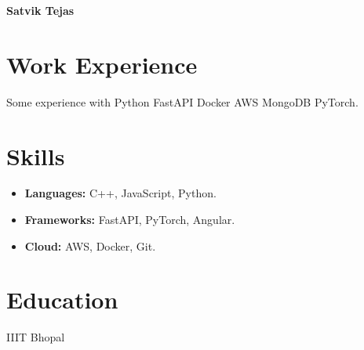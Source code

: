 \documentclass[10pt,letterpaper]{article}
\begin{document}
\begin{center}{\LARGE \textbf{Satvik Tejas}}\end{center}
\section{Work Experience}
Some experience with Python FastAPI Docker AWS MongoDB PyTorch.
\section{Skills}
\begin{itemize}
\item \textbf{Languages:} C++, JavaScript, Python.
\item \textbf{Frameworks:} FastAPI, PyTorch, Angular.
\item \textbf{Cloud:} AWS, Docker, Git.
\end{itemize}
\section{Education}
IIIT Bhopal
\end{document}
